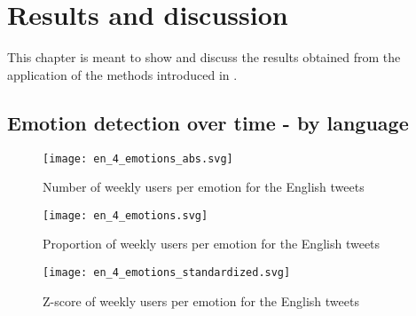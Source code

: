 \graphicspath{{chapters/chapter4/img/}}

\chapter{Results and discussion}
\label{cha:results}

This chapter is meant to show and discuss the results obtained from the application of the methods introduced in .

\section{Emotion detection over time - by language}
\label{sec:emotion-by-language-res}

\begin{figure}[H]
	\centering
    	\texttt{[image: en\_4\_emotions\_abs.svg]}
    	\caption{Number of weekly users per emotion for the English tweets}
    	\label{fig:en-4-emotions-abs}
\end{figure}

\begin{figure}[H]
	\centering
    	\texttt{[image: en\_4\_emotions.svg]}
    	\caption{Proportion of weekly users per emotion for the English tweets}
    	\label{fig:en-4-emotions}
\end{figure}

\begin{figure}[H]
	\centering
    	\texttt{[image: en\_4\_emotions\_standardized.svg]}
    	\caption{Z-score of weekly users per emotion for the English tweets}
    	\label{fig:en-4-emotions-std}
\end{figure}